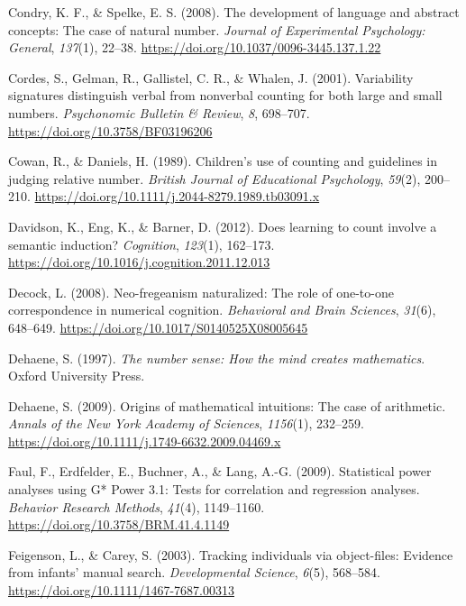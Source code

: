 \documentclass[
  man,floatsintext]{apa7}
\newlength{\cslhangindent}
\newenvironment{CSLReferences}[2] %
 {\begin{list}{}{%
  \setlength{\itemindent}{0pt}
  \setlength{\leftmargin}{0pt}
  \setlength{\parsep}{0pt}
  \ifodd #1
   \setlength{\leftmargin}{\cslhangindent}
   \setlength{\itemindent}{-1\cslhangindent}
  \fi
  \setlength{\itemsep}{#2\baselineskip}}}
 {\end{list}}
\begin{document}
\begin{CSLReferences}{1}{0}
Condry, K. F., \& Spelke, E. S. (2008). The development of language and abstract concepts: {The} case of natural number. \emph{Journal of Experimental Psychology: General}, \emph{137}(1), 22--38. \url{https://doi.org/10.1037/0096-3445.137.1.22}

Cordes, S., Gelman, R., Gallistel, C. R., \& Whalen, J. (2001). Variability signatures distinguish verbal from nonverbal counting for both large and small numbers. \emph{Psychonomic Bulletin \& Review}, \emph{8}, 698--707. \url{https://doi.org/10.3758/BF03196206}

Cowan, R., \& Daniels, H. (1989). Children's use of counting and guidelines in judging relative number. \emph{British Journal of Educational Psychology}, \emph{59}(2), 200--210. \url{https://doi.org/10.1111/j.2044-8279.1989.tb03091.x}

Davidson, K., Eng, K., \& Barner, D. (2012). Does learning to count involve a semantic induction? \emph{Cognition}, \emph{123}(1), 162--173. \url{https://doi.org/10.1016/j.cognition.2011.12.013}

Decock, L. (2008). Neo-fregeanism naturalized: The role of one-to-one correspondence in numerical cognition. \emph{Behavioral and Brain Sciences}, \emph{31}(6), 648--649. \url{https://doi.org/10.1017/S0140525X08005645}

Dehaene, S. (1997). \emph{The number sense: How the mind creates mathematics}. Oxford University Press.

Dehaene, S. (2009). Origins of mathematical intuitions: The case of arithmetic. \emph{Annals of the New York Academy of Sciences}, \emph{1156}(1), 232--259. \url{https://doi.org/10.1111/j.1749-6632.2009.04469.x}

Faul, F., Erdfelder, E., Buchner, A., \& Lang, A.-G. (2009). Statistical power analyses using {G* Power 3.1}: Tests for correlation and regression analyses. \emph{Behavior Research Methods}, \emph{41}(4), 1149--1160. \url{https://doi.org/10.3758/BRM.41.4.1149}

Feigenson, L., \& Carey, S. (2003). Tracking individuals via object-files: Evidence from infants' manual search. \emph{Developmental Science}, \emph{6}(5), 568--584. \url{https://doi.org/10.1111/1467-7687.00313}


\end{CSLReferences}
\end{document}
